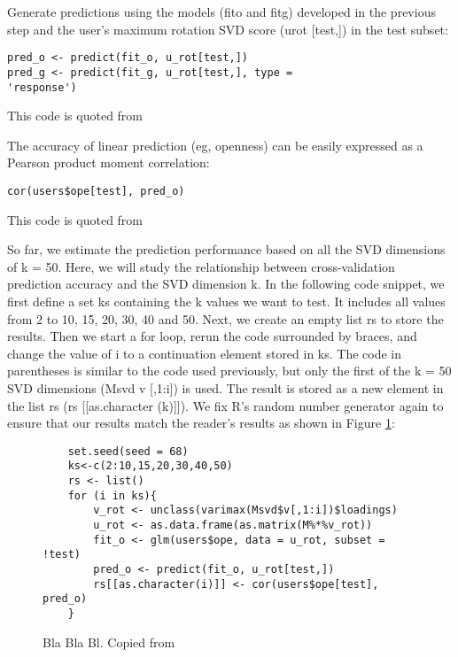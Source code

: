 Generate predictions using the models (fito and fitg) developed in
 the previous step and the user's maximum rotation SVD score 
(urot [test,]) in the test subset:

\begin{verbatim}
pred_o <- predict(fit_o, u_rot[test,])
pred_g <- predict(fit_g, u_rot[test,], type =
'response')
\end{verbatim}

This code is quoted from~\cite{editor12}

The accuracy of linear prediction (eg, openness) can be easily 
expressed as a Pearson product moment correlation:

\begin{verbatim}
cor(users$ope[test], pred_o)
\end{verbatim}

This code is quoted from~\cite{editor12}

So far, we estimate the prediction performance based on all the SVD
 dimensions of k = 50. Here, we will study the relationship between
 cross-validation prediction accuracy and the SVD dimension k. In 
the following code snippet, we first define a set ks containing the
 k values we want to test. It includes all values from 2 to 10, 15,
 20, 30, 40 and 50. Next, we create an empty list rs to store the 
results. Then we start a for loop, rerun the code surrounded by 
braces, and change the value of i to a continuation element stored
 in ks. The code in parentheses is similar to the code used 
previously, but only the first of the k = 50 SVD dimensions (Msvd 
 v [,1:i]) is used. The result is stored as a new element in the 
list rs (rs [[as.character (k)]]). We fix R's random number generator
 again to ensure that our results match the reader's results as shown
 in Figure \ref{F:bla}:


\begin{figure}[htb]
\begin{footnotesize}
\begin{verbatim}
    set.seed(seed = 68)
    ks<-c(2:10,15,20,30,40,50)
    rs <- list()
    for (i in ks){
        v_rot <- unclass(varimax(Msvd$v[,1:i])$loadings)
        u_rot <- as.data.frame(as.matrix(M%*%v_rot))
        fit_o <- glm(users$ope, data = u_rot, subset = !test)
        pred_o <- predict(fit_o, u_rot[test,])
        rs[[as.character(i)]] <- cor(users$ope[test], pred_o)
    }
\end{verbatim}
\end{footnotesize}
\caption{Bla Bla Bl. Copied from~\cite{editor12}}\label{F:bla}
\end{figure}



